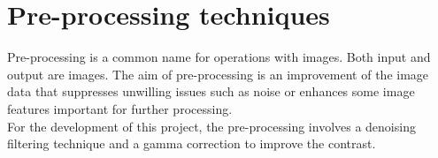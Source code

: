 \documentclass{standalone}
\begin{document}
\section{Pre-processing techniques}
Pre-processing is a common name for operations with images. 
Both input and output are images. 
The aim of pre-processing is an improvement of the image data that suppresses unwilling issues such as noise or enhances some image features important for further processing\cite{pre-processing}.
\\
For the development of this project, the pre-processing involves a denoising filtering technique and a gamma correction to improve the contrast. 
\end{document}
